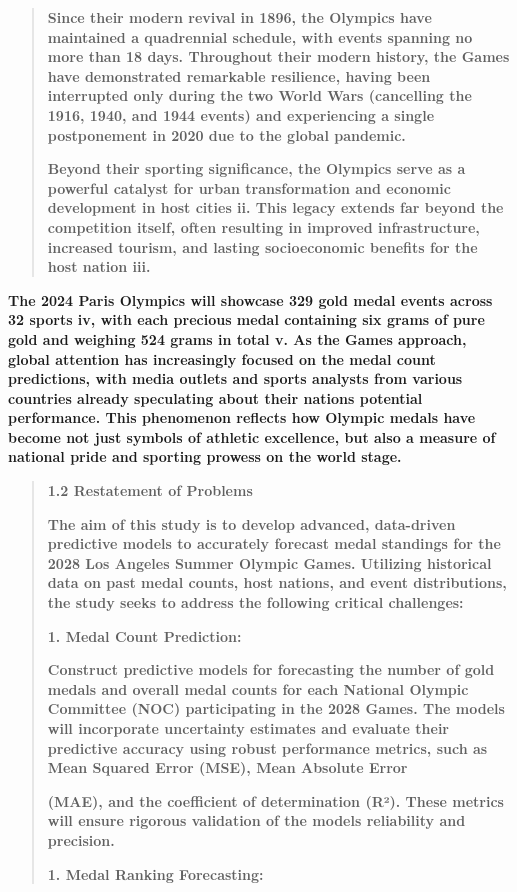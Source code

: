 \documentclass[12pt,a4paper]{article}
\renewenvironment{quote}{\begin{quotation}}{\end{quotation}}  %
\begin{document}
\begin{quote}
    \textbf{Since their modern revival in 1896, the Olympics have maintained
    a quadrennial schedule, with events spanning no more than 18 days.
    Throughout their modern history, the Games have demonstrated remarkable
    resilience, having been interrupted only during the two World Wars
    (cancelling the 1916, 1940, and 1944 events) and experiencing a single
    postponement in 2020 due to the global pandemic.}
    
    \textbf{Beyond their sporting significance, the Olympics serve as a
    powerful catalyst for urban transformation and economic development in
    host cities ii. This legacy extends far beyond the competition itself,
    often resulting in improved infrastructure, increased tourism, and
    lasting socioeconomic benefits for the host nation iii.}
    \end{quote}
    
    \textbf{The 2024 Paris Olympics will showcase 329 gold medal events
    across 32 sports iv, with each precious medal containing six grams of
    pure gold and weighing 524 grams in total v. As the Games approach,
    global attention has increasingly focused on the medal count
    predictions, with media outlets and sports analysts from various
    countries already speculating about their nations\textquotesingle{}
    potential performance. This phenomenon reflects how Olympic medals have
    become not just symbols of athletic excellence, but also a measure of
    national pride and sporting prowess on the world stage.}
    
    \begin{quote}
    \protect{}\label{bookmark4-1}{}\textbf{1.2 Restatement of
    Problems}
    
    \textbf{The aim of this study is to develop advanced, data-driven
    predictive models to accurately forecast medal standings for the 2028
    Los Angeles Summer Olympic Games. Utilizing historical data on past
    medal counts, host nations, and event distributions, the study seeks to
    address the following critical challenges:}
    
    \textbf{1. Medal Count Prediction:}
    
    \textbf{Construct predictive models for forecasting the number of gold
    medals and overall medal counts for each National Olympic Committee
    (NOC) participating in the 2028 Games. The models will incorporate
    uncertainty estimates and evaluate their predictive accuracy using
    robust performance metrics, such as Mean Squared Error (MSE), Mean
    Absolute Error}
    
    \textbf{(MAE), and the coefficient of determination (R²). These metrics
    will ensure rigorous validation of the models\textquotesingle{}
    reliability and precision.}
    
    \textbf{1. Medal Ranking Forecasting:}
    \end{quote}
    
\end{document}
